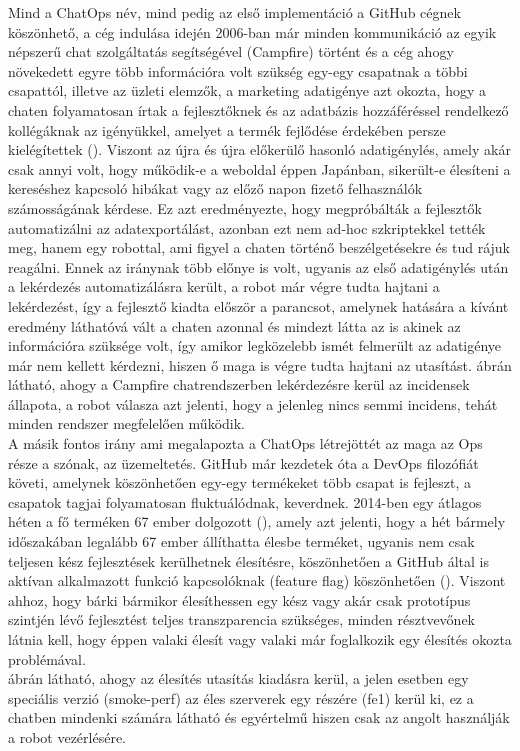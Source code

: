 Mind a ChatOps név, mind pedig az első implementáció a GitHub cégnek köszönhető, a cég indulása idején 2006-ban már minden kommunikáció az egyik népszerű chat szolgáltatás segítségével (Campfire) történt és a cég ahogy növekedett egyre több információra volt szükség egy-egy csapatnak a többi csapattól, illetve az üzleti elemzők, a marketing adatigénye azt okozta, hogy a chaten folyamatosan írtak a fejlesztőknek és az adatbázis hozzáféréssel rendelkező kollégáknak az igényükkel, amelyet a termék fejlődése érdekében persze kielégítettek (\cite{what_is_chatops_slideshow}). Viszont az újra és újra előkerülő hasonló adatigénylés, amely akár csak annyi volt, hogy működik-e a weboldal éppen Japánban, sikerült-e élesíteni a kereséshez kapcsoló hibákat vagy az előző napon fizető felhasználók számosságának kérdese. Ez azt eredményezte, hogy megpróbálták a fejlesztők automatizálni az adatexportálást, azonban ezt nem ad-hoc szkriptekkel tették meg, hanem egy robottal, ami figyel a chaten történő beszélgetésekre és tud rájuk reagálni. Ennek az iránynak több előnye is volt, ugyanis az első adatigénylés után a lekérdezés automatizálásra került, a robot már végre tudta hajtani a lekérdezést, így a fejlesztő kiadta először a parancsot, amelynek hatására a kívánt eredmény láthatóvá vált a chaten azonnal és mindezt látta az is akinek az információra szüksége volt, így amikor legközelebb ismét felmerült az adatigénye már nem kellett kérdezni, hiszen ő maga is végre tudta hajtani az utasítást.  ábrán látható, ahogy a Campfire chatrendszerben lekérdezésre kerül az incidensek állapota, a robot válasza azt jelenti, hogy a jelenleg nincs semmi incidens, tehát minden rendszer megfelelően működik. \\
A másik fontos irány ami megalapozta a ChatOps létrejöttét az maga az Ops része a szónak, az üzemeltetés. GitHub már kezdetek óta a DevOps filozófiát követi, amelynek köszönhetően egy-egy termékeket több csapat is fejleszt, a csapatok tagjai folyamatosan fluktuálódnak, keverdnek.  2014-ben egy átlagos héten a fő terméken 67 ember dolgozott (\cite{github_product_team}), amely azt jelenti, hogy a hét bármely időszakában legalább 67 ember állíthatta élesbe terméket, ugyanis nem csak teljesen kész fejlesztések kerülhetnek élesítésre, köszönhetően a GitHub által is aktívan alkalmazott funkció kapcsolóknak (feature flag) köszönhetően (\cite{github_feature_flag}). Viszont ahhoz, hogy bárki bármikor élesíthessen egy kész vagy akár csak prototípus szintjén lévő fejlesztést teljes transzparencia szükséges, minden résztvevőnek látnia kell, hogy éppen valaki élesít vagy valaki már foglalkozik egy élesítés okozta problémával.\\
 ábrán látható, ahogy az élesítés utasítás kiadásra kerül, a jelen esetben egy speciális verzió (smoke-perf) az éles szerverek egy részére (fe1) kerül ki, ez a chatben mindenki számára látható és egyértelmű hiszen csak az angolt használják a robot vezérlésére.

